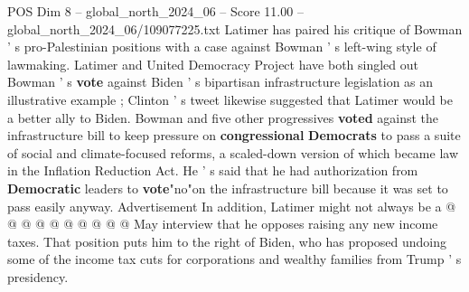 \begin{textsample}{POS Dim 8 – global\_north\_2024\_06 – Score 11.00 – global\_north\_2024\_06/109077225.txt}
Latimer has paired his critique of Bowman ' s pro-Palestinian positions with a case against Bowman ' s left-wing style of lawmaking.
Latimer and United Democracy Project have both singled out Bowman ' s \textbf{vote} against Biden ' s bipartisan infrastructure legislation as an illustrative example ; Clinton ' s tweet likewise suggested that Latimer would be a better ally to Biden.
Bowman and five other progressives \textbf{voted} against the infrastructure bill to keep pressure on \textbf{congressional} \textbf{Democrats} to pass a suite of social and climate-focused reforms, a scaled-down version of which became law in the Inflation Reduction Act.
He ' s said that he had authorization from \textbf{Democratic} leaders to \textbf{vote}"no"on the infrastructure bill because it was set to pass easily anyway.
Advertisement In addition, Latimer might not always be a @ @ @ @ @ @ @ @ @ @ May interview that he opposes raising any new income taxes.
That position puts him to the right of Biden, who has proposed undoing some of the income tax cuts for corporations and wealthy families from Trump ' s presidency.

\end{textsample}
